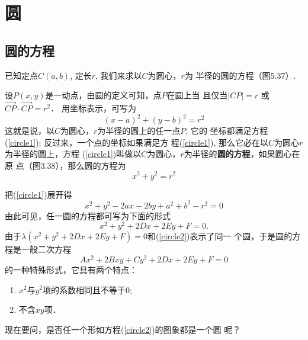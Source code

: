 \section{圆}
\subsection{圆的方程}
已知定点$C(a,b)$, 定长$r$, 我们来求以$C$为圆心，$r$为
半径的圆的方程（图5.37）.

设$P(x,y)$是一动点，由圆的定义可知，点$P$在圆上当
且仅当$|CP|=r$
或$\Vec{CP}\cdot \Vec{CP}=r^2$．
用坐标表示，可写为
\begin{equation}\label{circle1}
(x-a)^2+(y-b)^2=r^2
\end{equation}
这就是说，以$C$为圆心，$r$为半径的圆上的任一点$P$, 它的
坐标都满足方程(\ref{circle1}); 反过来，一个点的坐标如果满足方
程(\ref{circle1}), 那么它必在以$C$为圆心$r$为半径的圆上，方程
(\ref{circle1})叫做以$C$为圆心，$r$为半径的\textbf{圆的方程}，如果圆心在原
点（图3.38），那么圆的方程为
\begin{equation}
    x^2+y^2=r^2
\end{equation}

\begin{figure}[htp]\centering
    \begin{minipage}[t]{0.48\textwidth}
    \centering
    \caption{}
    \end{minipage}
    \begin{minipage}[t]{0.48\textwidth}
    \centering
    \caption{}
    \end{minipage}
    \end{figure}


把(\ref{circle1})展开得
\[x^2+y^2-2ax-2by+a^2+b^2-r^2=0\]
由此可见，任一圆的方程都可写为下面的形式
\begin{equation}\label{circle2}
    x^2+y^2+2Dx+2Ey+F=0.
\end{equation}
由于$\lambda(x^2+y^2+2Dx+2Ey+F)=0$和(\ref{circle2})表示了同一
个圆，于是圆的方程是一般二次方程
\[Ax^2+2Bxy+Cy^2+2Dx+2Ey+F=0\]
的一种特殊形式，它具有两个特点：
\begin{enumerate}
    \item $x^2$与$y^2$项的系数相同且不等于0;
    \item 不含$xy$项．
\end{enumerate}
现在要问，是否任一个形如方程(\ref{circle2})的图象都是一个圆
呢？

